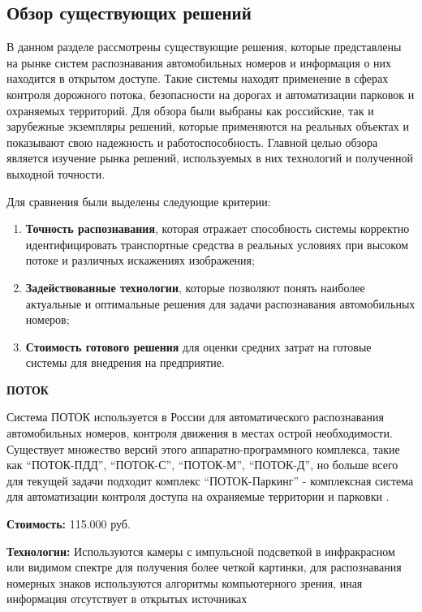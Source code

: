\documentclass[a4paper,12pt]{article}
\begin{document}
\subsection{Обзор существующих решений}

В данном разделе рассмотрены существующие решения, которые представлены на рынке систем распознавания автомобильных номеров и информация о них находится в открытом доступе. Такие системы находят применение в сферах контроля дорожного потока, безопасности на дорогах и автоматизации парковок и охраняемых территорий.
Для обзора были выбраны как российские, так и зарубежные экземпляры решений, которые применяются на реальных объектах и показывают свою надежность и работоспособность.
Главной целью обзора является изучение рынка решений, используемых в них технологий и полученной выходной точности.

Для сравнения были выделены следующие критерии:
\begin{enumerate}
    \item \textbf{Точность распознавания}, которая отражает способность системы корректно идентифицировать транспортные средства в реальных условиях при высоком потоке и различных искажениях изображения;
    \item \textbf{Задействованные технологии}, которые позволяют понять наиболее актуальные и оптимальные решения для задачи распознавания автомобильных номеров;
    \item \textbf{Стоимость готового решения} для оценки средних затрат на готовые системы для внедрения на предприятие.
\end{enumerate}

\textbf{ПОТОК}

Система ПОТОК используется в России для автоматического распознавания автомобильных номеров, контроля движения в местах острой необходимости. Существует множество версий этого аппаратно-программного комплекса, такие как ``ПОТОК-ПДД'', ``ПОТОК-С'', ``ПОТОК-М'', ``ПОТОК-Д'', но больше всего для текущей задачи подходит комплекс ``ПОТОК-Паркинг'' - комплексная система для автоматизации контроля доступа на охраняемые территории и парковки \cite{potok}.

\textbf{Стоимость:} 115.000 руб.

\textbf{Технологии:} Используются камеры с импульсной подсветкой в инфракрасном или видимом спектре для получения более четкой картинки, для распознавания номерных знаков используются алгоритмы компьютерного зрения, иная информация отсутствует в открытых источниках 
\end{document}
